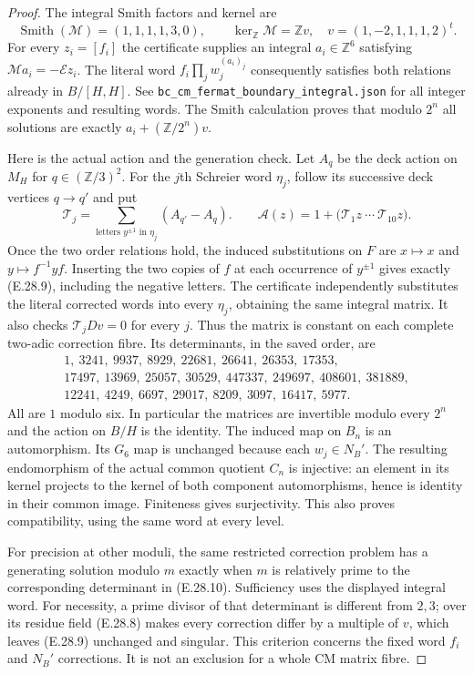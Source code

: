 \begin{proof}
The integral Smith factors and kernel are
\[
 \operatorname{Smith}(\mathcal M)=(1,1,1,1,3,0),\qquad
 \ker_{\mathbb Z}\mathcal M=\mathbb Z v,\quad
 v=(1,-2,1,1,1,2)^t .
 \tag{E.28.8}
\]
For every $z_i=[f_i]$ the certificate supplies an integral
$a_i\in\mathbb Z^6$ satisfying
$\mathcal M a_i=-\mathcal E z_i$.
The literal word $f_i\prod_j w_j^{(a_i)_j}$ consequently
satisfies both relations already in $B/[H,H]$.
See \texttt{bc\_cm\_fermat\_boundary\_integral.json}
for all integer exponents and resulting words.
The Smith calculation proves that modulo $2^n$ all solutions
are exactly $a_i+(\mathbb Z/2^n)v$.

Here is the actual action and the generation check.  Let $A_q$
be the deck action on $M_H$ for $q\in(\mathbb Z/3)^2$.
For the $j$th Schreier word $\eta_j$, follow its successive
deck vertices $q\to q'$ and put
\[
 \mathcal T_j=\sum_{\text{letters }y^{\pm1}\text{ in }\eta_j}
                         (A_{q'}-A_q).
 \qquad
 \mathcal A(z)=1+
       \bigl(\mathcal T_1z\ \cdots\ \mathcal T_{10}z\bigr).
 \tag{E.28.9}
\]
Once the two order relations hold, the induced substitutions
on $F$ are $x\mapsto x$ and $y\mapsto f^{-1}yf$.
Inserting the two copies of $f$ at each occurrence of
$y^{\pm1}$ gives exactly (E.28.9), including the negative
letters.  The certificate independently substitutes the
literal corrected words into every $\eta_j$, obtaining the
same integral matrix.  It also checks
$\mathcal T_jDv=0$ for every $j$.
Thus the matrix is constant on each complete two-adic
correction fibre.  Its determinants, in the saved order, are
\[
 \begin{gathered}
 1,\ 3241,\ 9937,\ 8929,\ 22681,\ 26641,\ 26353,\ 17353,\\
 17497,\ 13969,\ 25057,\ 30529,\ 447337,\ 249697,\ 408601,\ 381889,\\
 12241,\ 4249,\ 6697,\ 29017,\ 8209,\ 3097,\ 16417,\ 5977 .
 \end{gathered}
 \tag{E.28.10}
\]
All are $1$ modulo six.  In particular the matrices are
invertible modulo every $2^n$ and the action on $B/H$ is
the identity.  The induced map on $B_n$ is an automorphism.
Its $G_6$ map is unchanged because each $w_j\in N_B'$.
The resulting endomorphism of the actual common quotient
$C_n$ is injective: an element in its kernel projects to
the kernel of both component automorphisms, hence is
identity in their common image.  Finiteness gives
surjectivity.  This also proves compatibility, using the
same word at every level.

For precision at other moduli, the same restricted correction
problem has a generating solution modulo $m$ exactly when
$m$ is relatively prime to the corresponding determinant
in (E.28.10).  Sufficiency uses the displayed integral word.
For necessity, a prime divisor of that determinant is
different from $2,3$; over its residue field (E.28.8) makes
every correction differ by a multiple of $v$, which leaves
(E.28.9) unchanged and singular.  This criterion concerns
the fixed word $f_i$ and $N_B'$ corrections.  It is not an
exclusion for a whole CM matrix fibre.


\end{proof}
